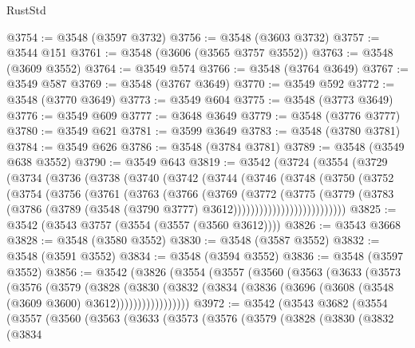 \begin{lexlean}{RustStd}
\begin{coremodule}
@3754 := @3548 (@3597 @3732)
@3756 := @3548 (@3603 @3732)
@3757 := @3544 @151
@3761 := @3548 (@3606 (@3565 @3757 @3552))
@3763 := @3548 (@3609 @3552)
@3764 := @3549 @574
@3766 := @3548 (@3764 @3649)
@3767 := @3549 @587
@3769 := @3548 (@3767 @3649)
@3770 := @3549 @592
@3772 := @3548 (@3770 @3649)
@3773 := @3549 @604
@3775 := @3548 (@3773 @3649)
@3776 := @3549 @609
@3777 := @3648 @3649
@3779 := @3548 (@3776 @3777)
@3780 := @3549 @621
@3781 := @3599 @3649
@3783 := @3548 (@3780 @3781)
@3784 := @3549 @626
@3786 := @3548 (@3784 @3781)
@3789 := @3548 (@3549 @638 @3552)
@3790 := @3549 @643
@3819 := @3542
    (@3724
      (@3554
        (@3729
          (@3734
            (@3736
              (@3738
                (@3740
                  (@3742
                    (@3744
                      (@3746
                        (@3748
                          (@3750
                            (@3752
                              (@3754
                                (@3756
                                  (@3761
                                    (@3763
                                      (@3766
                                        (@3769
                                          (@3772
                                            (@3775
                                              (@3779
                                                (@3783
                                                  (@3786
                                                    (@3789
                                                      (@3548
                                                        (@3790 @3777)
                                                        @3612))))))))))))))))))))))))))
@3825 := @3542 (@3543 @3757 (@3554 (@3557 (@3560 @3612))))
@3826 := @3543 @3668
@3828 := @3548 (@3580 @3552)
@3830 := @3548 (@3587 @3552)
@3832 := @3548 (@3591 @3552)
@3834 := @3548 (@3594 @3552)
@3836 := @3548 (@3597 @3552)
@3856 := @3542
    (@3826
      (@3554
        (@3557
          (@3560
            (@3563
              (@3633
                (@3573
                  (@3576
                    (@3579
                      (@3828
                        (@3830
                          (@3832
                            (@3834 (@3836 (@3696 (@3608 (@3548 (@3609 @3600) @3612)))))))))))))))))
@3972 := @3542
    (@3543
      @3682
      (@3554
        (@3557
          (@3560
            (@3563
              (@3633
                (@3573
                  (@3576
                    (@3579
                      (@3828
                        (@3830
                          (@3832
                            (@3834

\end{coremodule}
\end{lexlean}
